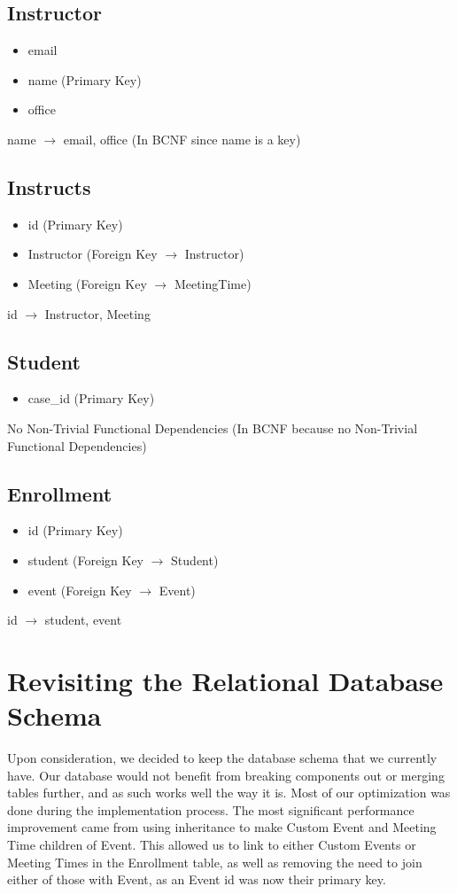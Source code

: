 \documentclass[pdftex,12pt,letter]{article}
\begin{document}
\subsection*{Instructor}
\begin{itemize}
\item email
\item name (Primary Key)
\item office
\end{itemize}
name $\rightarrow$ email, office (In BCNF since name is a key)
\subsection*{Instructs}
\begin{itemize}
\item id (Primary Key)
\item Instructor (Foreign Key $\rightarrow$ Instructor)
\item Meeting (Foreign Key $\rightarrow$ MeetingTime)
\end{itemize}
id $\rightarrow$ Instructor, Meeting
\subsection*{Student}
\begin{itemize}
\item case\_id (Primary Key)
\end{itemize}
No Non-Trivial Functional Dependencies (In BCNF because no Non-Trivial Functional Dependencies)
\subsection*{Enrollment}
\begin{itemize}
\item id (Primary Key)
\item student (Foreign Key $\rightarrow$ Student)
\item event (Foreign Key $\rightarrow$ Event)
\end{itemize}
id $\rightarrow$ student, event
\section{Revisiting the Relational Database Schema}
Upon consideration, we decided to keep the database schema that we currently have. Our database would not benefit from breaking components out or merging tables further, and as such works well the way it is. Most of our optimization was done during the implementation process. The most significant performance improvement came from using inheritance to make Custom Event and Meeting Time children of Event. This allowed us to link to either Custom Events or Meeting Times in the Enrollment table, as well as removing the need to join either of those with Event, as an Event id was now their primary key.
\end{document}
